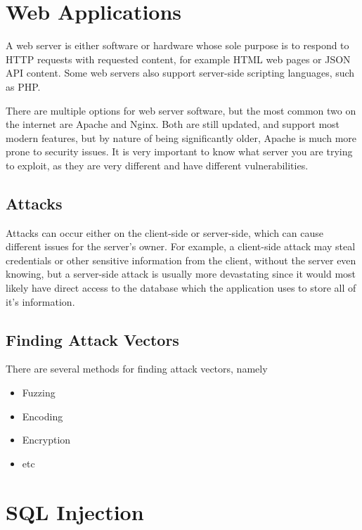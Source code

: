 
\section*{Web Applications}

A web server is either software or hardware whose sole purpose is to respond to HTTP requests with requested content,
 for example HTML web pages or JSON API content. Some web servers also support server-side scripting languages, such as
 PHP.
 
There are multiple options for web server software, but the most common two on the internet are Apache and Nginx. Both
 are still updated, and support most modern features, but by nature of being significantly older, Apache is much more
 prone to security issues. It is very important to know what server you are trying to exploit, as they are very different
 and have different vulnerabilities.

\subsection*{Attacks}

Attacks can occur either on the client-side or server-side, which can cause different issues for the server's owner. For
 example, a client-side attack may steal credentials or other sensitive information from the client, without the server
 even knowing, but a server-side attack is usually more devastating since it would most likely have direct access to the
 database which the application uses to store all of it's information.

\subsection*{Finding Attack Vectors}

There are several methods for finding attack vectors, namely
\begin{itemize}
  \item Fuzzing
  \item Encoding
  \item Encryption
  \item etc
\end{itemize}

\section*{SQL Injection}

